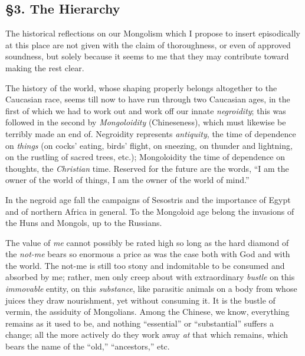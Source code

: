 \documentclass[12pt,a4paper]{book}
\begin{document}
\medskip{}

\subsection[\S{}3. The Hierarchy]{\centering \S{}3. The Hierarchy}

The historical reflections on our Mongolism which I propose to insert 
episodically at this place are not given with the claim of thoroughness, or 
even of approved soundness, but solely because it seems to me that they may 
contribute toward making the rest clear.

The history of the world, whose shaping properly belongs altogether to the 
Caucasian race, seems till now to have run through two Caucasian ages, in the 
first of which we had to work out and work off our innate \textit{negroidity}; 
this was followed in the second by \textit{Mongoloidity} (Chineseness), which 
must likewise be terribly made an end of. Negroidity represents 
\textit{antiquity}, the time of dependence on \textit{things} (on cocks' 
eating, birds' flight, on sneezing, on thunder and lightning, on the rustling 
of sacred trees, etc.); Mongoloidity the time of dependence on thoughts, the 
\textit{Christian} time. Reserved for the future are the words, ``I am the 
owner of the world of things, I am the owner of the world of mind.''

In the negroid age fall the campaigns of Sesostris and the importance of Egypt 
and of northern Africa in general. To the Mongoloid age belong the invasions 
of the Huns and Mongols, up to the Russians.

The value of \textit{me} cannot possibly be rated high so long as the hard 
diamond of the \textit{not-me} bears so enormous a price as was the case both 
with God and with the world. The not-me is still too stony and indomitable to 
be consumed and absorbed by me; rather, men only creep about with 
extraordinary \textit{bustle} on this \textit{immovable} entity, on this 
\textit{substance}, like parasitic animals on a body from whose juices they 
draw nourishment, yet without consuming it. It is the bustle of vermin, the 
assiduity of Mongolians. Among the Chinese, we know, everything remains as it 
used to be, and nothing ``essential'' or ``substantial'' suffers a change; 
all the more actively do they work away \textit{at} that which remains, which 
bears the name of the ``old,'' ``ancestors,'' etc.
\end{document}
